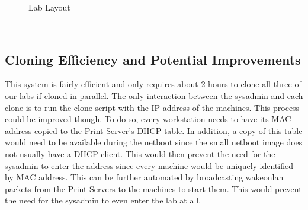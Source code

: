 \begin{figure}
  \begin{center}
  \end{center}
  \caption{Lab Layout}
  \label{fig:RoomNetworkLayout}
\end{figure}

\
\vskip1pt
\ 

\subsection{Cloning Efficiency and Potential Improvements}
This system is fairly efficient and only requires about 2 hours to clone all three of our labs if cloned in parallel.  The only interaction between the sysadmin and each clone is to run the clone script with the IP address of the machines.  This process could be improved though.  To do so, every workstation needs to have its MAC address copied to the Print Server's DHCP table.  In addition, a copy of this table would need to be available during the netboot since the small netboot image does not usually have a DHCP client.  This would then prevent the need for the sysadmin to enter the address since every machine would be uniquely identified by MAC address.  This can be further automated by broadcasting wakeonlan packets from the Print Servers to the machines to start them.  This would prevent the need for the sysadmin to even enter the lab at all.  

